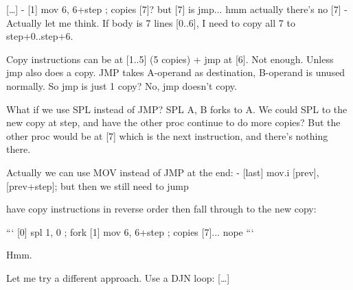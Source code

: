 \begin{decodedreasoningpanel}
{[\ldots]} - [1] mov 6, 6+step       ; copies [7]? but [7] is jmp... hmm actually there's no [7]
- Actually let me think. If body is 7 lines [0..6], I need to copy all 7 to step+0..step+6.

Copy instructions can be at [1..5] (5 copies) + jmp at [6]. Not enough. Unless jmp also does a copy. JMP takes A-operand as destination, B-operand is unused normally. So jmp is just 1 copy? No, jmp doesn't copy.

What if we use SPL instead of JMP? SPL A, B forks to A. We could SPL to the new copy at step, and have the other proc continue to do more copies? But the other proc would be at [7] which is the next instruction, and there's nothing there.

Actually we can use MOV instead of JMP at the end:
- [last] mov.i [prev], [prev+step]; but then we still need to jump

 have copy instructions in reverse order then fall through to the new copy:

```
[0] spl 1, 0                    ; fork
[1] mov 6, 6+step               ; copies [7]... nope
```

Hmm.

Let me try a different approach. Use a DJN loop: {[\ldots]}
\end{decodedreasoningpanel}
